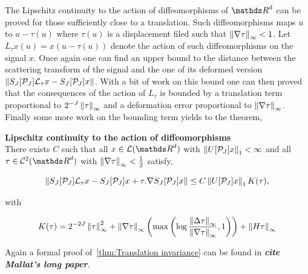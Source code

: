 \documentclass[a4paper,11pt]{report}
\begin{document}
{			The Lipschitz continuity to the action of diffeomorphisms of $\dsR^{d}$ can be proved for those sufficiently close to a translation. Such diffeomorphisms maps $u$ to $u-\tau(u)$ where $\tau(u)$ is a displacement filed such that $\left\lVert \nabla \tau \right\rVert_{\infty} < 1$. Let $L_{\tau}x(u)=x(u-\tau(u))$ denote the action of such diffeomorphisms on the signal $x$. Once again one can find an upper bound to the distance between the scattering transform of the signal and the one of its deformed version $\left\lVert S_{J}[\mathcal{P}_{J}]\mathcal{L}_{\tau}x - S_{J}[\mathcal{P}_{J}]x \right\rVert$. With a bit of work on this bound one can then proved that the consequences of the action of $L_{\tau}$ is bounded by a translation term proportional to $2^{-J} \left\lVert \tau \right\rVert_{\infty}$ and a deformation error proportional to $\left\lVert \nabla \tau \right\rVert_{\infty}$. Finally some more work on the bounding term yields to the theorem,
			
			\begin{thm} \textbf{Lipschitz continuity to the action of diffeomorphisms} \\
			  There exists $C$ such that all $x \in \mathcal{L}(\dsR^{d})$ with $\left\lVert U[\mathcal{P}_{J}]x \right\rVert_{1} < \infty$ and all $\tau \in \mathcal{C}^{2}(\dsR^{d})$ with $\left\lVert \nabla \tau \right\rVert_{\infty} < \frac{1}{2}$ satisfy,
			  
			  \begin{equation}
					\left\lVert S_{J}[\mathcal{P}_{J}]\mathcal{L}_{\tau}x - S_{J}[\mathcal{P}_{J}]x + \tau . \nabla S_{J}[\mathcal{P}_{J}]x \right\rVert \leq C \left\lVert U[\mathcal{P}_{J}]x \right\rVert_{1} K(\tau),
					\label{eq:Lipschitz continuity 1}
			  \end{equation}

			  with
			  
			  \begin{equation}
					K(\tau) = 2^{-2J} \left\lVert \tau \right\rVert_{\infty}^{2} + \left\lVert \nabla \tau \right\rVert_{\infty} \left(\max \left( \log \frac{\left\lVert \Delta \tau \right\rVert_{\infty}}{\left\lVert \nabla \tau \right\rVert_{\infty}},1 \right) \right) + \left\lVert H\tau \right\rVert_{\infty} 
					\label{eq:Lipschitz continuity K(tau)}
			  \end{equation}
			  
			  \label{thm:Lipschitz continuity}
			\end{thm}
			
			\begin{note}
			  Again a formal proof of~\ref{thm:Translation invariance} can be found in \textbf{\textit{cite Mallat's long paper}}.
			\end{note}

}
\end{document}
